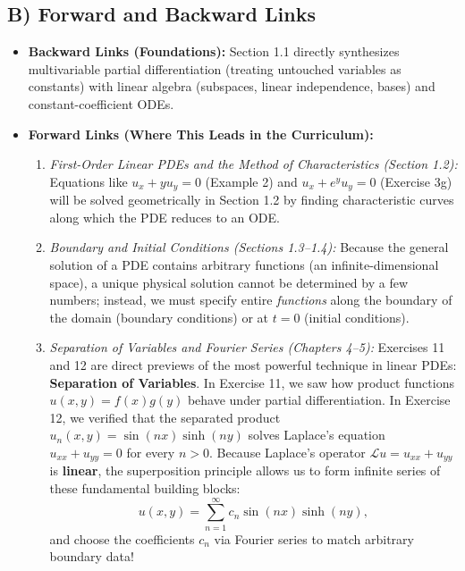 \documentclass[11pt,a4paper]{article}
\begin{document}
\subsection{B) Forward and Backward Links}
\begin{itemize}
    \item \textbf{Backward Links (Foundations):} Section 1.1 directly synthesizes multivariable partial differentiation (treating untouched variables as constants) with linear algebra (subspaces, linear independence, bases) and constant-coefficient ODEs.
    \item \textbf{Forward Links (Where This Leads in the Curriculum):}
    \begin{enumerate}
        \item \emph{First-Order Linear PDEs and the Method of Characteristics (Section 1.2):} Equations like $u_x + y u_y = 0$ (Example 2) and $u_x + e^y u_y = 0$ (Exercise 3g) will be solved geometrically in Section 1.2 by finding characteristic curves along which the PDE reduces to an ODE.
        \item \emph{Boundary and Initial Conditions (Sections 1.3--1.4):} Because the general solution of a PDE contains arbitrary functions (an infinite-dimensional space), a unique physical solution cannot be determined by a few numbers; instead, we must specify entire \emph{functions} along the boundary of the domain (boundary conditions) or at $t = 0$ (initial conditions).
        \item \emph{Separation of Variables and Fourier Series (Chapters 4--5):} Exercises 11 and 12 are direct previews of the most powerful technique in linear PDEs: \textbf{Separation of Variables}. In Exercise 11, we saw how product functions $u(x,y) = f(x)g(y)$ behave under partial differentiation. In Exercise 12, we verified that the separated product $u_n(x, y) = \sin(nx)\sinh(ny)$ solves Laplace's equation $u_{xx} + u_{yy} = 0$ for every $n > 0$. Because Laplace's operator $\mathcal{L}u = u_{xx} + u_{yy}$ is \textbf{linear}, the superposition principle allows us to form infinite series of these fundamental building blocks:
        \[
            u(x, y) = \sum_{n=1}^{\infty} c_n \sin(nx)\sinh(ny),
        \]
        and choose the coefficients $c_n$ via Fourier series to match arbitrary boundary data!
    \end{enumerate}
\end{itemize}

\newpage
\end{document}
